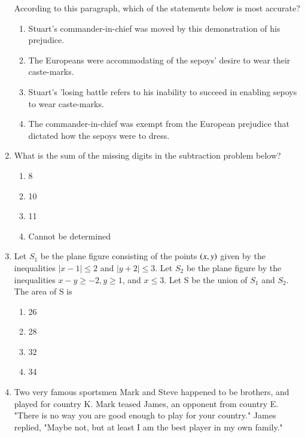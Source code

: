 \documentclass[journal,12pt,onecolumn]{IEEEtran}
\theoremstyle{remark}
\begin{document}
\begin{enumerate}
According to this paragraph, which of the statements below is most accurate?
\begin{enumerate}
    \item Stuart's commander-in-chief was moved by this demonstration of his prejudice.
    \item The Europeans were accommodating of the sepoys' desire to wear their caste-marks. 
    \item Stuart's 'losing battle refers to his inability to succeed in enabling sepoys to wear caste-marks.
    \item The commander-in-chief was exempt from the European prejudice that dictated how the sepoys were to dress.
\end{enumerate}
\item What is the sum of the missing digits in the subtraction problem below?\\
\begin{figure}[!ht]
\centering
{}%

\label{fig:my_label}
\end{figure}
\begin{enumerate}
    \item 8
    \item 10
    \item 11
    \item Cannot be determined
\end{enumerate}
\item Let $S_1$ be the plane figure consisting of the points $\left(x, y\right)$ given by the inequalities $|x-1| \leq 2$ and $|y+2|\leq 3$. Let $S_2$ be the plane figure by the inequalities $x-y \geq -2, y \geq 1$, and $x \leq 3$. Let S be the union of $S_1$ and $S_2$. The area of S is
\begin{enumerate}
    \item 26
    \item 28
    \item 32
    \item 34
\end{enumerate}
\item Two very famous sportsmen Mark and Steve happened to be brothers, and played for country K. Mark teased James, an opponent from country E. "There is no way you are good enough to play for your country." James replied, "Maybe not, but at least I am the best player in my own family."


\end{enumerate}
\end{document}
